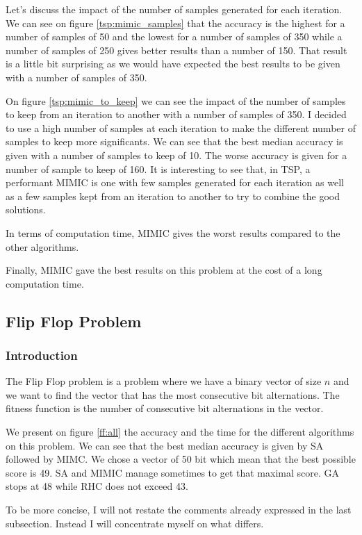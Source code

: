 \documentclass[twocolumn, 10pt]{article}
\begin{document}
				Let's discuss the impact of the number of samples generated for each iteration. We can see on figure \ref{tsp:mimic_samples} that the accuracy is the highest for a number of samples of 50 and the lowest for a number of samples of 350 while a number of samples of 250 gives better results than a number of 150. That result is a little bit surprising as we would have expected the best results to be given with a number of samples of 350.

				On figure \ref{tsp:mimic_to_keep} we can see the impact of the number of samples to keep from an iteration to another with a number of samples of 350. I decided to use a high number of samples at each iteration to make the different number of samples to keep more significants. We can see that the best median accuracy is given with a number of samples to keep of 10. The worse accuracy is given for a number of sample to keep of 160. It is interesting to see that, in TSP, a performant MIMIC is one with few samples generated for each iteration as well as a few samples kept from an iteration to another to try to combine the good solutions.

				In terms of computation time, MIMIC gives the worst results compared to the other algorithms.

				Finally, MIMIC gave the best results on this problem at the cost of a long computation time.
		\subsection{Flip Flop Problem}
			\subsubsection*{Introduction}
				The Flip Flop problem is a problem where we have a binary vector of size $n$ and we want to find the vector that has the most consecutive bit alternations. The fitness function is the number of consecutive bit alternations in the vector.

				We present on figure \ref{ff:all} the accuracy and the time for the different algorithms on this problem. We can see that the best median accuracy is given by SA followed by MIMC. We chose a vector of 50 bit which mean that the best possible score is 49. SA and MIMIC manage sometimes to get that maximal score. GA stops at 48 while RHC does not exceed 43.

				To be more concise, I will not restate the comments already expressed in the last subsection. Instead I will concentrate myself on what differs.
\end{document}
